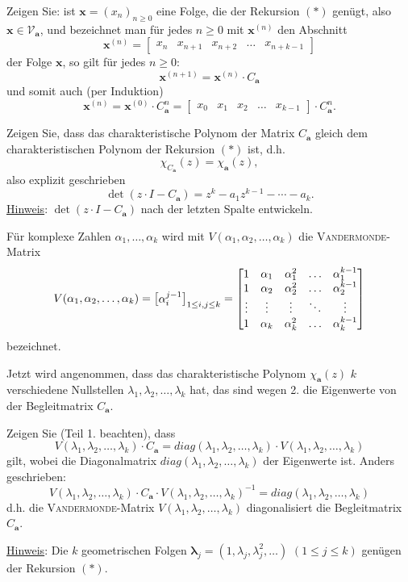\begin{flushenum}
\item Zeigen Sie: ist ${\mathbf x} = (x_n)_{n \geq 0}$  eine Folge, die der Rekursion $(*)$
	genügt, also  ${\mathbf x} \in \mathcal{V}_{{\mathbf a}}$, 
	und bezeichnet man für jedes $n \geq 0$ mit ${\mathbf x}^{(n)}$ den Abschnitt
	\[
	{\mathbf x}^{(n)} = \begin{bmatrix} x_n & x_{n+1}  & x_{n+2} & \ldots & x_{n+k-1} \end{bmatrix}
	\]
	der Folge ${\mathbf x}$, so gilt für jedes $n \geq 0$:
	\[
	{\mathbf x}^{(n+1)} = {\mathbf x}^{(n)} \cdot C_{{\mathbf a}}
	\]
	und somit auch (per Induktion)
	\[
	{\mathbf x}^{(n)} = {\mathbf x}^{(0)} \cdot C_{{\mathbf a}}^n = 
	\begin{bmatrix} x_{0} & x_{1}  & x_{2} & \ldots & x_{k-1} \end{bmatrix}\cdot C_{{\mathbf a}}^n .
	\]
\item Zeigen Sie, dass das charakteristische Polynom der Matrix $C_{{\mathbf a}}$ 
	gleich dem charakteristischen Polynom der Rekursion $(*)$ ist, d.h.
	\[
	\chi_{C_{{\mathbf a}}}(z) = \chi_{{\mathbf a}}(z),
	\]
	also explizit geschrieben
	\[
	\det (z \cdot I - C_{{\mathbf a}}) = z^k - a_1 z^{k-1}- \cdots - a_k.
	\]
	\underline{Hinweis}: $\det (z \cdot I - C_{{\mathbf a}})$ nach der letzten Spalte entwickeln.
	
\item Für  komplexe Zahlen $\alpha_1, \ldots , \alpha_k$ wird mit
	$V(\alpha_1,\alpha_2,\ldots,\alpha_k)$ die \textsc{Vandermonde}-Matrix
	\[
	V(\alpha_1,\alpha_2,\ldots,\alpha_k) = 
		\begin{bmatrix}
			\alpha_i^{j-1}
		\end{bmatrix}_{1 \leq i,j \leq k}
	= \begin{bmatrix}
	1 & \alpha_1 & \alpha_1^2 & \ldots & \alpha_1^{k-1} \cr
	1 & \alpha_2 & \alpha_2^2 & \ldots & \alpha_2^{k-1} \cr
	\vdots & \vdots & \vdots & \ddots & \vdots \cr
	1 & \alpha_k & \alpha_k^2 & \ldots & \alpha_k^{k-1} 
	\end{bmatrix}
	\]
	bezeichnet.
	
	Jetzt wird angenommen, dass das charakteristische Polynom $\chi_{{\mathbf a}}(z)$
	$k$ verschiedene Nullstellen $\lambda_1,\lambda_2,\ldots,\lambda_k$ hat, das sind 
	wegen 2. die Eigenwerte von der Begleitmatrix $C_{{\mathbf a}}$.
	
	Zeigen Sie (Teil 1. beachten), dass
	\[
	V(\lambda_1,\lambda_2,\ldots,\lambda_k) \cdot C_{{\mathbf a}} =
	diag(\lambda_1,\lambda_2,\ldots,\lambda_k) \cdot V(\lambda_1,\lambda_2,\ldots,\lambda_k)
	\]
	gilt, wobei die Diagonalmatrix $diag(\lambda_1,\lambda_2,\ldots,\lambda_k)$ der Eigenwerte ist.
	Anders geschrieben:
	\[
	V(\lambda_1,\lambda_2,\ldots,\lambda_k) \cdot C_{{\mathbf a}} \cdot V(\lambda_1,\lambda_2,\ldots,\lambda_k)^{-1}= 
	diag(\lambda_1,\lambda_2,\ldots,\lambda_k)
	\]
	d.h. die \textsc{Vandermonde}-Matrix $V(\lambda_1,\lambda_2,\ldots,\lambda_k)$
	diagonalisiert die Begleitmatrix $C_{{\mathbf a}}$.
	
	
	\underline{Hinweis}:  Die $k$ geometrischen Folgen 
	${\boldsymbol \lambda}_j = (1,\lambda_j,\lambda_j^2, \ldots)$
	$(1 \leq j \leq k)$ genügen der Rekursion $(*)$.

\end{flushenum}
